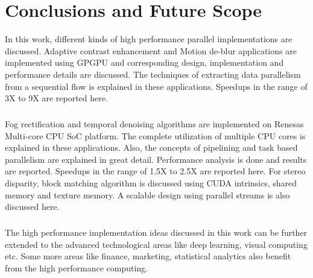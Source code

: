 \chapter{Conclusions and Future Scope}
In this work, different kinds of high performance parallel implementations are discussed. Adaptive contrast enhancement and Motion de-blur applications are implemented using GPGPU and corresponding design, implementation and performance details are discussed. The techniques of extracting data parallelism from a sequential flow is explained in these applications. Speedups in the range of 3X to 9X are reported here.\paragraph*{}Fog rectification and temporal denoising algorithms are implemented on Renesas Multi-core CPU SoC platform. The complete utilization of multiple CPU cores is explained in these applications. Also, the concepts of pipelining and task based parallelism are explained in great detail. Performance analysis is done and results are reported. Speedups in the range of 1.5X to 2.5X are reported here. For stereo disparity, block matching algorithm is discussed using CUDA intrinsics, shared memory and texture memory. A scalable design using parallel streams is also discussed here. \paragraph*{}The high performance implementation ideas discussed in this work can be further extended to the advanced technological areas like deep learning, visual computing etc. Some more areas like finance, marketing, statistical analytics also benefit from the high performance computing.
